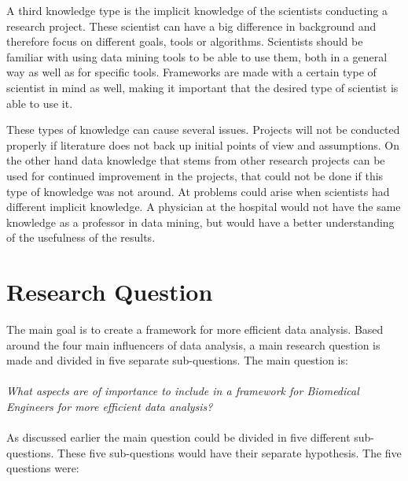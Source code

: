 \documentclass[10pt,a4paper]{article}
\begin{document}
	A third knowledge type is the implicit knowledge of the scientists conducting a research project. These scientist can have a big difference in background and therefore focus on different goals, tools or algorithms. Scientists should be familiar with using data mining tools to be able to use them, both in a general way as well as for specific tools. Frameworks are made with a certain type of scientist in mind as well, making it important that the desired type of scientist is able to use it\cite{zupan2006knowledge}.

	These types of knowledge can cause several issues. Projects will not be conducted properly if literature does not back up initial points of view and assumptions. On the other hand data knowledge that stems from other research projects can be used for continued improvement in the projects, that could not be done if this type of knowledge was not around. At problems could arise when scientists had different implicit knowledge. A physician at the hospital would not have the same knowledge as a professor in data mining, but would have a better understanding of the usefulness of the results. 
	
	\section{Research Question}
	\label{sec:ResearchQuestion}
	
	The main goal is to create a framework for more efficient data analysis. Based around the four main influencers of data analysis, a main research question is made and divided in five separate sub-questions. The main question is:\\
	\\
	\emph{What aspects are of importance to include in a framework for Biomedical Engineers for more efficient data analysis?}\\
	\\
	As discussed earlier the main question could be divided in five different sub-questions. These five sub-questions would have their separate hypothesis. The five questions were:
	
\end{document}
